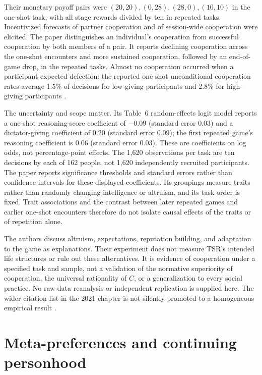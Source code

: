 Their monetary payoff pairs were \((20,20),(0,28),(28,0),(10,10)\)
in the one-shot task, with all stage rewards divided by ten in repeated
tasks. Incentivized forecasts of partner cooperation and of session-wide
cooperation were elicited. The paper distinguishes an individual's
cooperation from successful cooperation by both members of a pair.
It reports declining cooperation across the one-shot encounters and
more sustained cooperation, followed by an end-of-game drop, in the
repeated tasks. Almost no cooperation occurred when a participant
expected defection: the reported one-shot unconditional-cooperation
rates average 1.5\% of decisions for low-giving participants and 2.8\%
for high-giving participants
\parencite[pp.~8--12]{BarredaTarrazonaEtAl2017Cooperation}.

The uncertainty and scope matter. Its Table~6 random-effects logit
model reports a one-shot reasoning-score coefficient of \(-0.09\)
(standard error \(0.03\)) and a dictator-giving coefficient of
\(0.20\) (standard error \(0.09\)); the first repeated game's
reasoning coefficient is \(0.06\) (standard error \(0.03\)).
These are coefficients on log odds, not percentage-point effects.
The 1,620 observations per task are ten decisions by each of 162
people, not 1,620 independently recruited participants. The paper
reports significance thresholds and standard errors rather than
confidence intervals for these displayed coefficients. Its groupings
measure traits rather than randomly changing intelligence or altruism,
and its task order is fixed. Trait associations and the contrast between
later repeated games and earlier one-shot encounters therefore do not
isolate causal effects of the traits or of repetition alone.

The authors discuss altruism, expectations, reputation building, and
adaptation to the game as explanations. Their experiment does not
measure TSR's intended life structures or rule out these alternatives.
It is evidence of cooperation under a specified task and sample, not
a validation of the normative superiority of cooperation, the universal
rationality of \(C\), or a generalization to every social practice.
No raw-data reanalysis or independent replication is supplied here.
The wider citation list in the 2021 chapter is not silently promoted to
a homogeneous empirical result
\parencite[pp.~9--12, especially Table~6]{BarredaTarrazonaEtAl2017Cooperation}.

\section{Meta-preferences and continuing personhood}
\label{sec:p11-rat105-metapreferences}

